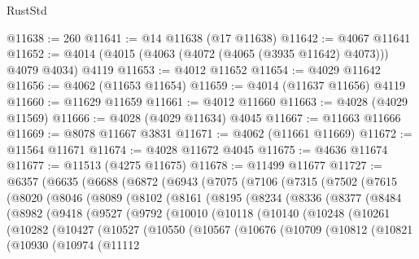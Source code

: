 \begin{lexlean}{RustStd}
\begin{coremodule}
@11638 := 260
@11641 := @14 @11638 (@17 @11638)
@11642 := @4067 @11641
@11652 := @4014 (@4015 (@4063 (@4072 (@4065 (@3935 @11642) @4073))) @4079 @4034) @4119
@11653 := @4012 @11652
@11654 := @4029 @11642
@11656 := @4062 (@11653 @11654)
@11659 := @4014 (@11637 @11656) @4119
@11660 := @11629 @11659
@11661 := @4012 @11660
@11663 := @4028 (@4029 @11569)
@11666 := @4028 (@4029 @11634) @4045
@11667 := @11663 @11666
@11669 := @8078 @11667 @3831
@11671 := @4062 (@11661 @11669)
@11672 := @11564 @11671
@11674 := @4028 @11672 @4045
@11675 := @4636 @11674
@11677 := @11513 (@4275 @11675)
@11678 := @11499 @11677
@11727 := @6357
    (@6635
      (@6688
        (@6872
          (@6943
            (@7075
              (@7106
                (@7315
                  (@7502
                    (@7615
                      (@8020
                        (@8046
                          (@8089
                            (@8102
                              (@8161
                                (@8195
                                  (@8234
                                    (@8336
                                      (@8377
                                        (@8484
                                          (@8982
                                            (@9418
                                              (@9527
                                                (@9792
                                                  (@10010
                                                    (@10118
                                                      (@10140
                                                        (@10248
                                                          (@10261
                                                            (@10282
                                                              (@10427
                                                                (@10527
                                                                  (@10550
                                                                    (@10567
                                                                      (@10676
                                                                        (@10709
                                                                          (@10812
                                                                            (@10821
                                                                              (@10930
                                                                                (@10974
                                                                                  (@11112

\end{coremodule}
\end{lexlean}
